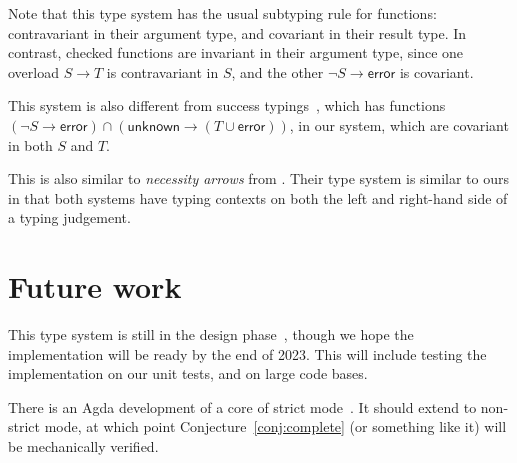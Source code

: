 \documentclass[sigplan]{acmart}
\newcommand{\ERROR}{\mathsf{error}}
\newcommand{\UNKNOWN}{\mathsf{unknown}}
\newcommand{\fun}{\mathbin{\rightarrow}}
\begin{document}
Note that this type system has the usual subtyping rule for
functions: contravariant in their argument type, and
covariant in their result type. In contrast, checked functions
are invariant in their argument type, since one overload
$S \fun T$ is contravariant in $S$, and the other $\neg S \fun \ERROR$
is covariant.

This system is also different from  success
typings~\cite{SuccessTyping}, which has functions
$(\neg S \fun \ERROR) \cap (\UNKNOWN \fun (T \cup \ERROR))$,
in our system, which are covariant in both $S$ and $T$.

This is also similar to \emph{necessity arrows} from \cite{RW23:IllTyped}. Their
type system is similar to ours in that both systems have typing contexts on both
the left and right-hand side of a typing judgement.

\section{Future work}

This type system is still in the design phase~\cite{NewNonStrictRFC}, though we hope
the implementation will be ready by the end of 2023. This will include
testing the implementation on our unit tests, and on large code bases.

There is an Agda development of a core of strict mode~\cite{BJ23:agda-typeck}.  It
should extend to non-strict mode, at which point
Conjecture~\ref{conj:complete} (or something like it)
will be mechanically verified.
  
 
\end{document}
